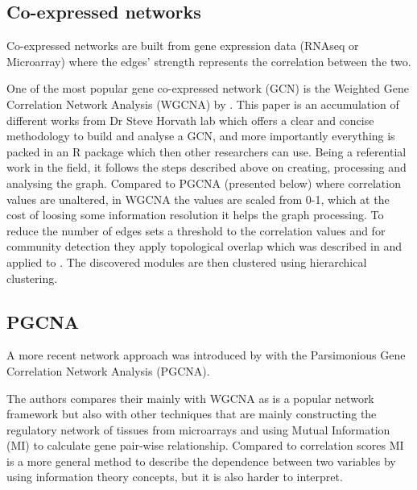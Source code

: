 \subsection{Co-expressed networks} \label{s:lit:co_net}

Co-expressed networks are built from gene expression data (RNAseq or Microarray) where the edges' strength represents the correlation between the two. 



One of the most popular gene co-expressed network (GCN) is the Weighted Gene Correlation Network Analysis (WGCNA) by \citet{Langfelder2008-sn}. This paper is an accumulation of different works from Dr Steve Horvath lab which offers a clear and concise methodology to build and analyse a GCN, and more importantly everything is packed in an R package which then other researchers can use. Being a referential work in the field, it follows the steps described above on creating, processing and analysing the graph. Compared to PGCNA (presented below) where correlation values are unaltered, in WGCNA the values are scaled from 0-1, which at the cost of loosing some information resolution it helps the graph processing. To reduce the number of edges \citet{Langfelder2008-sn} sets a threshold to the correlation values and for community detection they apply topological overlap which was described in\citet{Zhang2005-xq} and applied to \citet{Yip2007-mr, Li2007-vz, Ravasz2002-au}. The discovered modules are then clustered using hierarchical clustering.




\subsection{PGCNA}

A more recent network approach was introduced by \citet{Care2019-ij} with the Parsimonious Gene Correlation Network Analysis (PGCNA).

The authors compares their mainly with WGCNA as is a popular network framework but also with other techniques that are mainly constructing the regulatory network of tissues from microarrays and using Mutual Information (MI) \citet{Margolin2006-mc,Zhang2013-fs} to calculate gene pair-wise relationship. Compared to correlation scores MI is a more general method to describe the dependence between two variables by using information theory concepts, but it is also harder to interpret.

